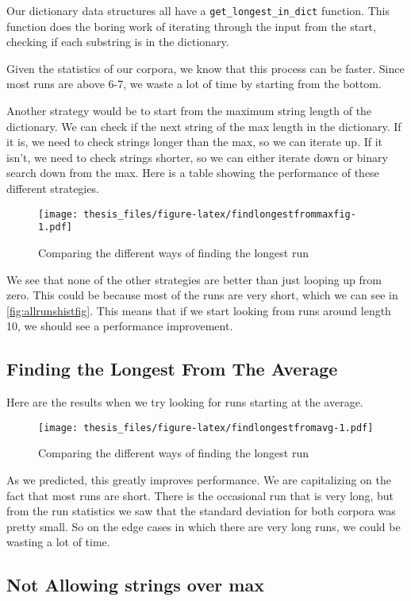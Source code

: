 \documentclass[12pt,twoside]{reedthesis}
\begin{document}
Our dictionary data structures all have a \texttt{get\_longest\_in\_dict} function. This function does the boring work of iterating through the input from the start, checking if each substring is in the dictionary.

Given the statistics of our corpora, we know that this process can be faster. Since most runs are above 6-7, we waste a lot of time by starting from the bottom.

Another strategy would be to start from the maximum string length of the dictionary. We can check if the next string of the max length in the dictionary. If it is, we need to check strings longer than the max, so we can iterate up. If it isn't, we need to check strings shorter, so we can either iterate down or binary search down from the max. Here is a table showing the performance of these different strategies.
\begin{figure}
\centering
\texttt{[image: thesis\_files/figure-latex/findlongestfrommaxfig-1.pdf]}
\caption{\label{fig:findlongestfrommaxfig}Comparing the different ways of finding the longest run}
\end{figure}
We see that none of the other strategies are better than just looping up from zero. This could be because most of the runs are very short, which we can see in \ref{fig:allrunshistfig}. This means that if we start looking from runs around length 10, we should see a performance improvement.

\hypertarget{finding-the-longest-from-the-average}{%
\subsection{Finding the Longest From The Average}\label{finding-the-longest-from-the-average}}

Here are the results when we try looking for runs starting at the average.
\begin{figure}
\centering
\texttt{[image: thesis\_files/figure-latex/findlongestfromavg-1.pdf]}
\caption{\label{fig:findlongestfromavg}Comparing the different ways of finding the longest run}
\end{figure}
As we predicted, this greatly improves performance. We are capitalizing on the fact that most runs are short. There is the occasional run that is very long, but from the run statistics we saw that the standard deviation for both corpora was pretty small. So on the edge cases in which there are very long runs, we could be wasting a lot of time.

\hypertarget{not-allowing-strings-over-max}{%
\subsection{Not Allowing strings over max}\label{not-allowing-strings-over-max}}
\end{document}
